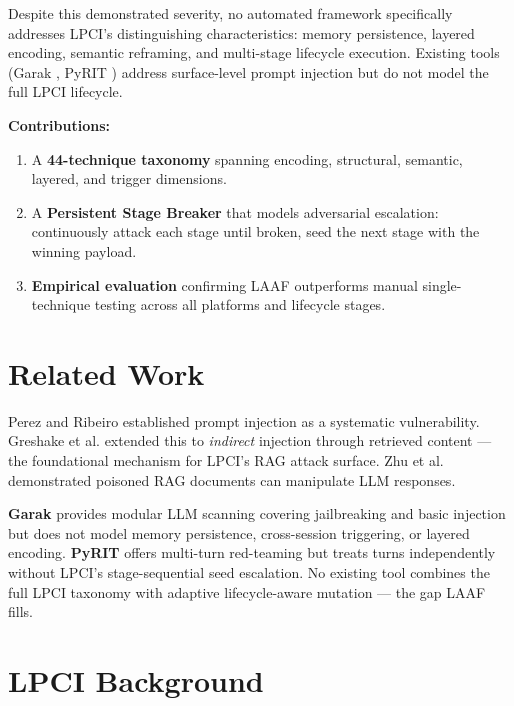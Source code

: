 \documentclass[10pt,twocolumn]{article}
\begin{document}
Despite this demonstrated severity, no automated framework specifically
addresses LPCI's distinguishing characteristics: memory persistence, layered
encoding, semantic reframing, and multi-stage lifecycle execution.  Existing
tools (Garak \cite{garak}, PyRIT \cite{pyrit}) address surface-level prompt
injection but do not model the full LPCI lifecycle.

\textbf{Contributions:}
\begin{enumerate}[leftmargin=*,topsep=2pt,itemsep=1pt]
  \item A \textbf{44-technique taxonomy} spanning encoding, structural,
        semantic, layered, and trigger dimensions.
  \item A \textbf{Persistent Stage Breaker} that models adversarial
        escalation: continuously attack each stage until broken, seed the
        next stage with the winning payload.
  \item \textbf{Empirical evaluation} confirming LAAF outperforms manual
        single-technique testing across all platforms and lifecycle stages.
\end{enumerate}

\section{Related Work}
\label{sec:related}

Perez and Ribeiro \cite{perez2022} established prompt injection as a
systematic vulnerability.  Greshake et al. \cite{greshake2023} extended this
to \textit{indirect} injection through retrieved content --- the foundational
mechanism for LPCI's RAG attack surface.  Zhu et al. \cite{zhu2023}
demonstrated poisoned RAG documents can manipulate LLM responses.

\textbf{Garak} \cite{garak} provides modular LLM scanning covering
jailbreaking and basic injection but does not model memory persistence,
cross-session triggering, or layered encoding.  \textbf{PyRIT} \cite{pyrit}
offers multi-turn red-teaming but treats turns independently without
LPCI's stage-sequential seed escalation.  No existing tool combines the
full LPCI taxonomy with adaptive lifecycle-aware mutation --- the gap LAAF
fills.

\section{LPCI Background}
\label{sec:lpci}
\end{document}

